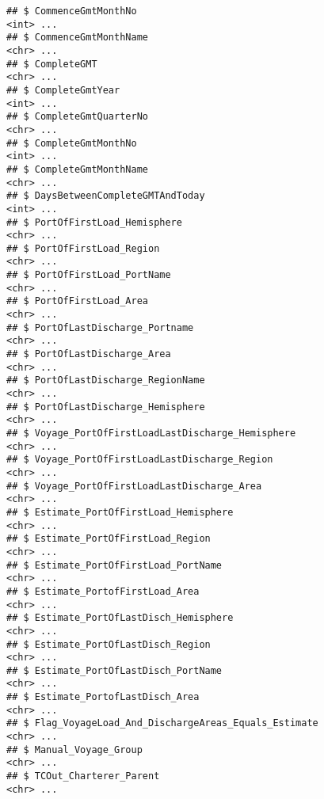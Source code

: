 \documentclass[]{article}
\begin{document}
\begin{verbatim}
## $ CommenceGmtMonthNo                                                      <int> ...
## $ CommenceGmtMonthName                                                    <chr> ...
## $ CompleteGMT                                                             <chr> ...
## $ CompleteGmtYear                                                         <int> ...
## $ CompleteGmtQuarterNo                                                    <chr> ...
## $ CompleteGmtMonthNo                                                      <int> ...
## $ CompleteGmtMonthName                                                    <chr> ...
## $ DaysBetweenCompleteGMTAndToday                                          <int> ...
## $ PortOfFirstLoad_Hemisphere                                              <chr> ...
## $ PortOfFirstLoad_Region                                                  <chr> ...
## $ PortOfFirstLoad_PortName                                                <chr> ...
## $ PortOfFirstLoad_Area                                                    <chr> ...
## $ PortOfLastDischarge_Portname                                            <chr> ...
## $ PortOfLastDischarge_Area                                                <chr> ...
## $ PortOfLastDischarge_RegionName                                          <chr> ...
## $ PortOfLastDischarge_Hemisphere                                          <chr> ...
## $ Voyage_PortOfFirstLoadLastDischarge_Hemisphere                          <chr> ...
## $ Voyage_PortOfFirstLoadLastDischarge_Region                              <chr> ...
## $ Voyage_PortOfFirstLoadLastDischarge_Area                                <chr> ...
## $ Estimate_PortOfFirstLoad_Hemisphere                                     <chr> ...
## $ Estimate_PortOfFirstLoad_Region                                         <chr> ...
## $ Estimate_PortOfFirstLoad_PortName                                       <chr> ...
## $ Estimate_PortofFirstLoad_Area                                           <chr> ...
## $ Estimate_PortOfLastDisch_Hemisphere                                     <chr> ...
## $ Estimate_PortOfLastDisch_Region                                         <chr> ...
## $ Estimate_PortOfLastDisch_PortName                                       <chr> ...
## $ Estimate_PortofLastDisch_Area                                           <chr> ...
## $ Flag_VoyageLoad_And_DischargeAreas_Equals_Estimate                      <chr> ...
## $ Manual_Voyage_Group                                                     <chr> ...
## $ TCOut_Charterer_Parent                                                  <chr> ...

\end{verbatim}
\end{document}
